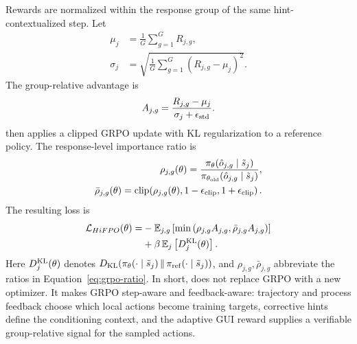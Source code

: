 Rewards are normalized within the response group of the same hint-contextualized step. Let
\begin{equation}
\label{eq:group-stats}
\begin{aligned}
    \mu_j&=\frac{1}{G}\sum_{g=1}^{G}R_{j,g},\\
    \sigma_j&=\sqrt{\frac{1}{G}\sum_{g=1}^{G}(R_{j,g}-\mu_j)^2}.
\end{aligned}
\end{equation}
The group-relative advantage is
\begin{equation}
\label{eq:grpo-adv}
    A_{j,g}=
    \frac{R_{j,g}-\mu_j}{\sigma_j+\epsilon_{\rm std}}.
\end{equation}
\hifpo then applies a clipped GRPO update with KL regularization to a reference policy. The response-level importance ratio is
\begin{equation}
\label{eq:grpo-ratio}
\begin{aligned}
    \rho_{j,g}(\theta)=
    \frac{\pi_\theta(\hat{o}_{j,g}\mid\tilde{s}_j)}
         {\pi_{\theta_{\rm old}}(\hat{o}_{j,g}\mid\tilde{s}_j)},\\
    \bar{\rho}_{j,g}(\theta)=
    \operatorname{clip}\!\left(
    \rho_{j,g}(\theta),
    1-\epsilon_{\rm clip},
    1+\epsilon_{\rm clip}
    \right).
\end{aligned}
\end{equation}
The resulting loss is
\begin{equation}
\label{eq:hifpo-objective}
\begin{aligned}
\mathcal{L}_{HiFPO}(\theta)
=&-\mathbb{E}_{j,g}
\left[\min\left(\rho_{j,g}A_{j,g},
\bar{\rho}_{j,g}A_{j,g}\right)\right]\\
&+\beta\,\mathbb{E}_{j}\left[D^{\rm KL}_{j}(\theta)\right].
\end{aligned}
\end{equation}
Here $D^{\rm KL}_{j}(\theta)$ denotes
$D_{\rm KL}\!\left(\pi_\theta(\cdot\mid\tilde{s}_j)\,\|\,\pi_{\rm ref}(\cdot\mid\tilde{s}_j)\right)$, and $\rho_{j,g},\bar{\rho}_{j,g}$ abbreviate the ratios in Equation~\ref{eq:grpo-ratio}.
In short, \hifpo does not replace GRPO with a new optimizer. It makes GRPO step-aware and feedback-aware: trajectory and process feedback choose which local actions become training targets, corrective hints define the conditioning context, and the adaptive GUI reward supplies a verifiable group-relative signal for the sampled actions.
